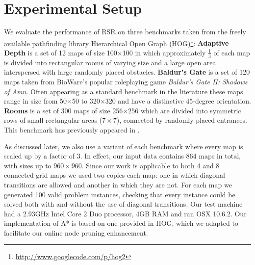 \section{Experimental Setup}
We evaluate the performance of RSR on three benchmarks taken from the freely
available pathfinding library Hierarchical Open Graph
(HOG)\footnote{\url{http://www.googlecode.com/p/hog2}}: {\textbf{Adaptive Depth}
is a set of 12 maps of size 100$\times$100 in which approximately $\frac{1}{3}$
of each map is divided into rectangular rooms of varying size and a large
open area interspersed with large randomly placed obstacles.} {\textbf{Baldur's
Gate} is a set of 120 maps taken from BioWare's popular roleplaying game
\emph{Baldur's Gate II: Shadows of Amn}.  Often appearing as a standard
benchmark in the literature \cite{bjornsson06,harabor10,pochter10} these maps
range in size from 50$\times$50 to 320$\times$320 and have a distinctive
45-degree orientation.} {\textbf{Rooms} is a set of 300 maps of size
256$\times$256 which are divided into symmetric rows of small rectangular areas
($7\times7$), connected by randomly placed entrances. This benchmark has
previously appeared in \cite{sturtevant09,pochter10,goldenberg10}.}

As discussed later, we also use a variant of each benchmark where every map is
scaled up by a factor of 3. In effect, our input data contains 864 maps in
total, with sizes up to $960\times960$.  Since our work is applicable to both 4
and 8 connected grid maps we used two copies each map: one in which diagonal
transitions are allowed and another in which they are not.  For each map we
generated 100 valid problem instances, checking that every instance could be
solved both with and without the use of diagonal transitions.  Our test machine
had a 2.93GHz Intel Core 2 Duo processor, 4GB RAM and ran OSX 10.6.2.  Our
implementation of A* is based on one provided in HOG, which we adapted to
facilitate our online node pruning enhancement.

